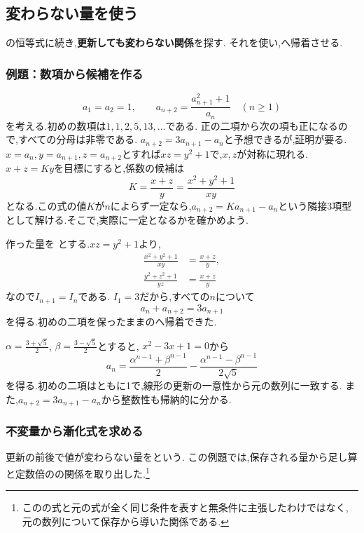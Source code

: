 \subsection{変わらない量を使う}\label{節：不変量から線形の関係}
  の恒等式に続き,\textbf{更新しても変わらない関係}を探す.
  それを使い,へ帰着させる.

  \subsubsection{例題：数項から候補を作る}
  \[
    a_1=a_2=1,\qquad
    a_{n+2}=\frac{a_{n+1}^2+1}{a_n}\quad(n\ge1)
  \]
  を考える.初めの数項は$1,1,2,5,13,\ldots$である.
  正の二項から次の項も正になるので,すべての分母は非零である.
  $a_{n+2}=3a_{n+1}-a_n$と予想できるが,証明が要る.
  $x=a_n,y=a_{n+1},z=a_{n+2}$とすれば$xz=y^2+1$で,$x,z$が対称に現れる.
  $x+z=Ky$を目標にすると,係数の候補は
  \[
    K=\frac{x+z}{y}=\frac{x^2+y^2+1}{xy}
  \]
  となる.この式の値$K$が$n$によらず一定なら,$a_{n+2}=Ka_{n+1}-a_n$という隣接3項型として解ける.そこで,実際に一定となるかを確かめよう.

  作った量を
  \BookMathLayout{\[
    I_n=\frac{a_n^2+a_{n+1}^2+1}{a_na_{n+1}}
  \]}{\[
    \begin{aligned}
      I_n=\frac{a_n^2+a_{n+1}^2+1}{a_na_{n+1}}
    \end{aligned}
  \]}
  とする.$xz=y^2+1$より,
  \[
    \begin{aligned}
      \frac{x^2+y^2+1}{xy}&=\frac{x+z}{y},\\
      \frac{y^2+z^2+1}{yz}&=\frac{x+z}{y}
    \end{aligned}
  \]
  なので$I_{n+1}=I_n$である.
  $I_1=3$だから,すべての$n$について
  \[
    a_n+a_{n+2}=3a_{n+1}
  \]
  を得る.初めの二項を保ったままのへ帰着できた.

  $\alpha=\frac{3+\sqrt5}{2}$, $\beta=\frac{3-\sqrt5}{2}$とすると,
  $x^2-3x+1=0$から
  \[
    a_n=\frac{\alpha^{n-1}+\beta^{n-1}}2
       -\frac{\alpha^{n-1}-\beta^{n-1}}{2\sqrt5}
  \]
  を得る.初めの二項はともに1で,線形の更新の一意性から元の数列に一致する.
  また,$a_{n+2}=3a_{n+1}-a_n$から整数性も帰納的に分かる.

  \subsubsection{不変量から漸化式を求める}
  更新の前後で値が変わらない量を\textbf{}という.
  この例題では,保存される量から足し算と定数倍のの関係を取り出した.\footnote{このの式と元の式が全く同じ条件を表すと無条件に主張したわけではなく,
  元の数列について保存から導いた関係である.}

